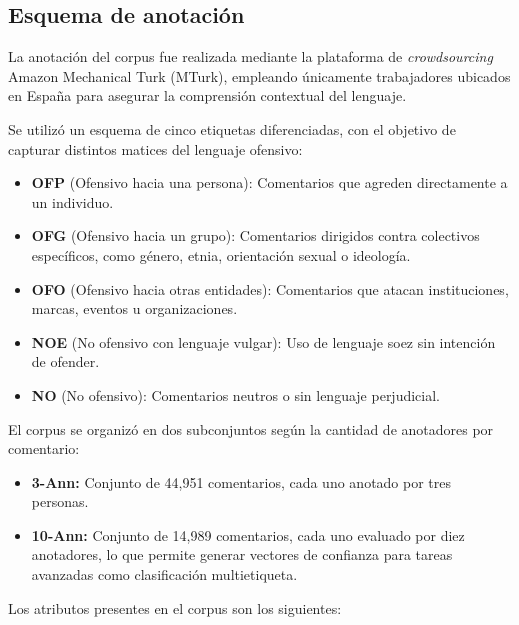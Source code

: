 \subsection{Esquema de anotación}

La anotación del corpus fue realizada mediante la plataforma de \textit{crowdsourcing} Amazon Mechanical Turk (MTurk), empleando únicamente trabajadores ubicados en España para asegurar la comprensión contextual del lenguaje.



\vspace{0.5cm}

Se utilizó un esquema de cinco etiquetas diferenciadas, con el objetivo de capturar distintos matices del lenguaje ofensivo:

\begin{itemize}
    \item \textbf{OFP} (Ofensivo hacia una persona): Comentarios que agreden directamente a un individuo.
    \item \textbf{OFG} (Ofensivo hacia un grupo): Comentarios dirigidos contra colectivos específicos, como género, etnia, orientación sexual o ideología.
    \item \textbf{OFO} (Ofensivo hacia otras entidades): Comentarios que atacan instituciones, marcas, eventos u organizaciones.
    \item \textbf{NOE} (No ofensivo con lenguaje vulgar): Uso de lenguaje soez sin intención de ofender.
    \item \textbf{NO} (No ofensivo): Comentarios neutros o sin lenguaje perjudicial.
\end{itemize}

El corpus se organizó en dos subconjuntos según la cantidad de anotadores por comentario:

\begin{itemize}
    \item \textbf{3-Ann:} Conjunto de 44,951 comentarios, cada uno anotado por tres personas.
    \item \textbf{10-Ann:} Conjunto de 14,989 comentarios, cada uno evaluado por diez anotadores, lo que permite generar vectores de confianza para tareas avanzadas como clasificación multietiqueta.
\end{itemize}

Los atributos presentes en el corpus son los siguientes:

